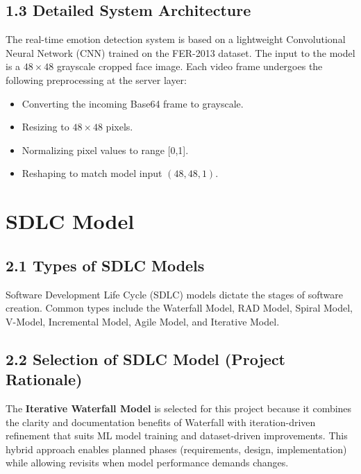 \documentclass[12pt,a4paper]{report}
\begin{document}
\section*{1.3 Detailed System Architecture}

The real-time emotion detection system is based on a lightweight Convolutional Neural Network (CNN) trained on the FER-2013 dataset. The input to the model is a \(48 \times 48\) grayscale cropped face image. Each video frame undergoes the following preprocessing at the server layer:
\begin{itemize}
    \item Converting the incoming Base64 frame to grayscale.
    \item Resizing to \(48 \times 48\) pixels.
    \item Normalizing pixel values to range [0,1].
    \item Reshaping to match model input \((48,48,1)\).
\end{itemize}

\clearpage


\chapter{SDLC Model}

\section*{2.1 Types of SDLC Models}

Software Development Life Cycle (SDLC) models dictate the stages of software creation. Common types include the Waterfall Model, RAD Model, Spiral Model, V-Model, Incremental Model, Agile Model, and Iterative Model.

\section*{2.2 Selection of SDLC Model (Project Rationale)}

The \textbf{Iterative Waterfall Model} is selected for this project because it combines the clarity and documentation benefits of Waterfall with iteration-driven refinement that suits ML model training and dataset-driven improvements. This hybrid approach enables planned phases (requirements, design, implementation) while allowing revisits when model performance demands changes.
\end{document}
